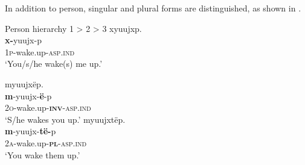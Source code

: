 \documentclass[output=paper,colorlinks,citecolor=brown,draft]{langscibook}
\begin{document}


In addition to person, singular and plural forms are distinguished, as shown in . 

{\ea\label{ex:mix:1} Person hierarchy 1 > 2 > 3
    \ea\label{ex:mix:1a}
        \glll xyuujxp. \\ 
             \textbf{x-}yuujx-p \\
             1\textsc{p}{}-wake.up-\textsc{asp.ind} \\
        \glt ‘You/s/he wake(s) me up.’
    
    \ex\label{ex:mix:1b}
        \glll myuujxëp. \\
              \textbf{m}{}-yuujx-\textbf{ë}{}-p \\
              2\textsc{o}{}-wake.up-\textbf{\textsc{inv}}\textsc{{}-asp.ind}\\
        \glt  ‘S/he wakes you up.’
    \ex\label{ex:mix:1c}
        \glll myuujxtëp.\\
             \textbf{m}{}-yuujx-\textbf{të-}p \\
             2\textsc{a}{}-wake.up-\textbf{\textsc{pl}}\textsc{{}-asp.ind}\\
        \glt ‘You wake them up.’
    \z
\z}
\end{document}
